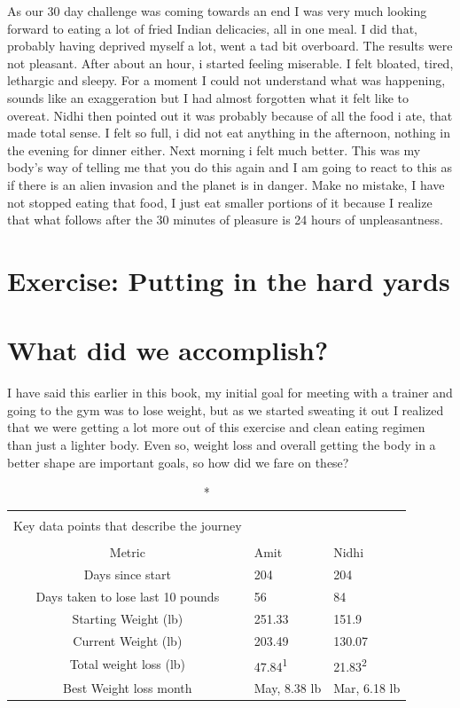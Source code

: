\documentclass[oneside]{book}
\begin{document}
As our 30 day challenge was coming towards an end I was very much
looking forward to eating a lot of fried Indian delicacies, all in one
meal. I did that, probably having deprived myself a lot, went a tad bit
overboard. The results were not pleasant. After about an hour, i started
feeling miserable. I felt bloated, tired, lethargic and sleepy. For a
moment I could not understand what was happening, sounds like an
exaggeration but I had almost forgotten what it felt like to overeat.
Nidhi then pointed out it was probably because of all the food i ate,
that made total sense. I felt so full, i did not eat anything in the
afternoon, nothing in the evening for dinner either. Next morning i felt
much better. This was my body's way of telling me that you do this again
and I am going to react to this as if there is an alien invasion and the
planet is in danger. Make no mistake, I have not stopped eating that
food, I just eat smaller portions of it because I realize that what
follows after the 30 minutes of pleasure is 24 hours of unpleasantness.

\chapter{Exercise: Putting in the hard
yards}\label{exercise-putting-in-the-hard-yards}

\chapter{What did we accomplish?}\label{what-did-we-accomplish}

I have said this earlier in this book, my initial goal for meeting with
a trainer and going to the gym was to lose weight, but as we started
sweating it out I realized that we were getting a lot more out of this
exercise and clean eating regimen than just a lighter body. Even so,
weight loss and overall getting the body in a better shape are important
goals, so how did we fare on these?

\captionsetup[table]{labelformat=empty,skip=1pt}

\begin{longtable}{cll}
\caption*{
\large \textbf{Important Metrics}\\ 
\small Key data points that describe the journey\\ 
} \\ 
\toprule
Metric & Amit & Nidhi \\ 
\midrule
Days since start & 204 & 204 \\ 
Days taken to lose last 10 pounds & 56 & 84 \\ 
Starting Weight (lb) & 251.33 & 151.9 \\ 
Current Weight (lb) & 203.49 & 130.07 \\ 
Total weight loss (lb) & 47.84\textsuperscript{1} & 21.83\textsuperscript{2} \\ 
Best Weight loss month & May, 8.38 lb & Mar, 6.18 lb \\ 
\bottomrule
\end{longtable}
\end{document}
